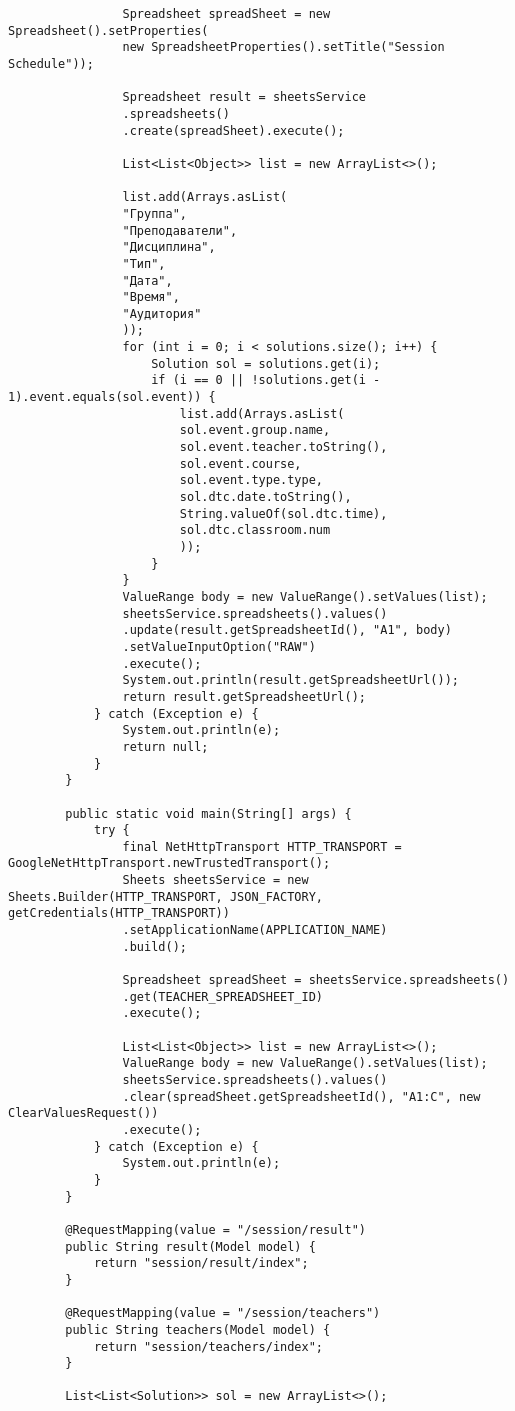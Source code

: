 \begin{lstlisting}
				Spreadsheet spreadSheet = new Spreadsheet().setProperties(
				new SpreadsheetProperties().setTitle("Session Schedule"));
				
				Spreadsheet result = sheetsService
				.spreadsheets()
				.create(spreadSheet).execute();
				
				List<List<Object>> list = new ArrayList<>();
				
				list.add(Arrays.asList(
				"Группа",
				"Преподаватели",
				"Дисциплина",
				"Тип",
				"Дата",
				"Время",
				"Аудитория"
				));
				for (int i = 0; i < solutions.size(); i++) {
					Solution sol = solutions.get(i);
					if (i == 0 || !solutions.get(i - 1).event.equals(sol.event)) {
						list.add(Arrays.asList(
						sol.event.group.name,
						sol.event.teacher.toString(),
						sol.event.course,
						sol.event.type.type,
						sol.dtc.date.toString(),
						String.valueOf(sol.dtc.time),
						sol.dtc.classroom.num
						));
					}
				}
				ValueRange body = new ValueRange().setValues(list);
				sheetsService.spreadsheets().values()
				.update(result.getSpreadsheetId(), "A1", body)
				.setValueInputOption("RAW")
				.execute();
				System.out.println(result.getSpreadsheetUrl());
				return result.getSpreadsheetUrl();
			} catch (Exception e) {
				System.out.println(e);
				return null;
			}
		}
		
		public static void main(String[] args) {
			try {
				final NetHttpTransport HTTP_TRANSPORT = GoogleNetHttpTransport.newTrustedTransport();
				Sheets sheetsService = new Sheets.Builder(HTTP_TRANSPORT, JSON_FACTORY, getCredentials(HTTP_TRANSPORT))
				.setApplicationName(APPLICATION_NAME)
				.build();
				
				Spreadsheet spreadSheet = sheetsService.spreadsheets()
				.get(TEACHER_SPREADSHEET_ID)
				.execute();
				
				List<List<Object>> list = new ArrayList<>();
				ValueRange body = new ValueRange().setValues(list);
				sheetsService.spreadsheets().values()
				.clear(spreadSheet.getSpreadsheetId(), "A1:C", new ClearValuesRequest())
				.execute();
			} catch (Exception e) {
				System.out.println(e);
			}
		}
		
		@RequestMapping(value = "/session/result")
		public String result(Model model) {
			return "session/result/index";
		}
		
		@RequestMapping(value = "/session/teachers")
		public String teachers(Model model) {
			return "session/teachers/index";
		}
		
		List<List<Solution>> sol = new ArrayList<>();
		

\end{lstlisting}
